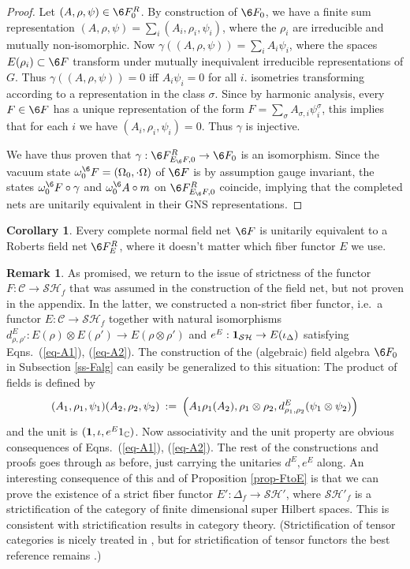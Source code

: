 \documentclass[11pt]{article}
\theoremstyle{definition}
\newtheorem{cor}[thm]{Corollary}
\theoremstyle{definition}
\newtheorem{note}[thm]{Remark}
\theoremstyle{remark}
\def\2#1{{\mathcal #1}}
\def\7#1{{\mathbb #1}}
\def\1#1{{\bf #1}}
\newcommand{\rarr}{\rightarrow}
\begin{document}
\begin{proof}
Let $(A,\rho,\psi)\in\6F^R_0$. By construction of $\6F_0$, we have a finite sum representation
$(A,\rho,\psi)=\sum_i(A_i,\rho_i,\psi_i)$, where the $\rho_i$ are irreducible and mutually
non-isomorphic. Now $\gamma((A,\rho,\psi))=\sum_i A_i\psi_i$, where the spaces
$E(\rho_i)\subset\6F$ transform under mutually inequivalent irreducible representations of $G$.
Thus $\gamma((A,\rho,\psi))=0$ iff $A_i\psi_i=0$ for all $i$. 
isometries transforming according to a representation in the class $\sigma$.
Since by harmonic analysis, every $F\in\6F$ has a unique representation of the form 
$F=\sum_\sigma A_{\sigma,i}\psi^\sigma_i$, this implies that for each $i$ we have
$(A_i,\rho_i,\psi_i)=0$. Thus $\gamma$ is injective.

We have thus proven that $\gamma:\6F^R_{E_\6F,0}\rarr\6F_0$ is an isomorphism. Since the vacuum state
$\omega_0^\6F=(\Omega_0,\cdot\Omega)$ of $\6F$ is by assumption gauge invariant, the states
$\omega_0^\6F\circ \gamma$ and $\omega_0^\6A\circ m$ on $\6F^R_{E_\6F,0}$ coincide, implying that
the completed nets are unitarily equivalent in their GNS representations.
\end{proof}

\begin{cor}
Every complete normal field net $\6F$ is unitarily equivalent to a Roberts field net $\6F^R_E$,
where it doesn't matter which fiber functor $E$ we use. 
\end{cor}

\begin{note}
As promised, we return to the issue of strictness of the functor $F:\2C\rarr\2S\2H_f$ that was
assumed in the construction of the field net, but not proven in the appendix. In the latter, we
constructed a non-strict fiber functor, i.e.\ a functor $E:\2C\rarr\2S\2H_f$ together with natural
isomorphisms $d^E_{\rho,\rho'}: E(\rho)\otimes E(\rho')\rarr E(\rho\otimes\rho')$ and
$e^E:\11_{\2S\2H}\rarr E(\iota_\Delta)$ satisfying Eqns.\ (\ref{eq-A1}), (\ref{eq-A2}).
The construction of the (algebraic) field algebra $\6F_0$ in Subsection \ref{ss-Falg} can easily be
generalized to this situation: The product of fields is defined by
\[ (A_1,\rho _1,\psi _1)(A_2,\rho _2,\psi _2)\: := \: \Bigl(
A_1\rho_1(A_2),\rho _1\otimes \rho _2, d^E_{\rho_1,\rho_2}(\psi
_1\otimes \psi _2) \Bigr) \] and the unit is
$(\11,\iota,e^E1_\7C)$. Now associativity and the unit property are
obvious consequences of Eqns.\ (\ref{eq-A1}), (\ref{eq-A2}). The rest
of the constructions and proofs goes through as before, just carrying
the unitaries $d^E, e^E$ along. An interesting consequence of this and
of Proposition \ref{prop-FtoE} is that we can prove the existence of a
strict fiber functor $E':\Delta_f\rarr\2S\2H'$, where $\2S\2H'_f$ is a
strictification of the category of finite dimensional super Hilbert
spaces. This is consistent with strictification results in category
theory. (Strictification of tensor categories is nicely treated in
\cite[Chap.\ XI]{kas}, but for strictification of tensor functors the
best reference remains \cite[Sect.\ 1]{stjo}.)
\end{note}
\end{document}
